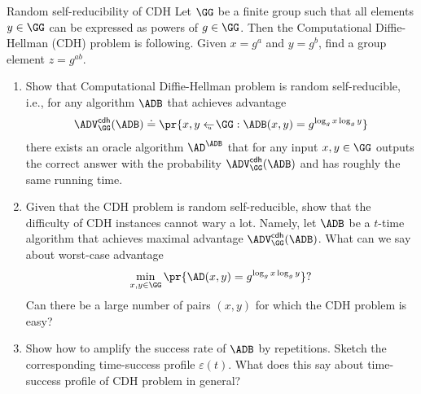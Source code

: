 \documentclass{crypto-exercise}
\author{Sven Laur}
\begin{document}
\begin{exercise}{Random self-reducibility of CDH}
  Let $\GG$ be a finite group such that all elements $y\in\GG$ can be
  expressed as powers of $g\in\GG$. Then the Computational
  Diffie-Hellman (CDH) problem is following. Given $x=g^a$ and
  $y=g^b$, find a group element $z=g^{ab}$.
  \begin{enumerate}
  \item Show that Computational Diffie-Hellman problem is random
    self-reducible, i.e., for any algorithm $\ADB$ that achieves
    advantage
    \begin{align*}
      \ADVCDH{\GG}{\ADB}\doteq\pr{x,y\getsu\GG: \ADB(x,y)=g^{\log_g
          x\log_g y}}
    \end{align*}
    there exists an oracle algorithm $\AD^{\ADB}$ that for any input
    $x,y\in\GG$ outputs the correct answer with the probability
    $\ADVCDH{\GG}{\ADB}$ and has roughly the same running time.
  \item Given that the CDH problem is random self-reducible, show that
    the difficulty of CDH instances cannot wary a lot. Namely, let
    $\ADB$ be a $t$-time algorithm that achieves maximal advantage
    $\ADVCDH{\GG}{\ADB}$. What can we say about worst-case advantage
    \begin{align*}
      \min_{x,y\in\GG}\pr{\AD(x,y)=g^{\log_g x\log_g y}}?
    \end{align*}
    Can there be a large number of pairs $(x,y)$ for which the CDH problem
    is easy?
   \item Show how to amplify the success rate of $\ADB$ by
    repetitions. Sketch the corresponding time-success profile
    $\varepsilon(t)$. What does this say about time-success profile of
    CDH problem in general?
  \end{enumerate}
\end{exercise}
\end{document}
